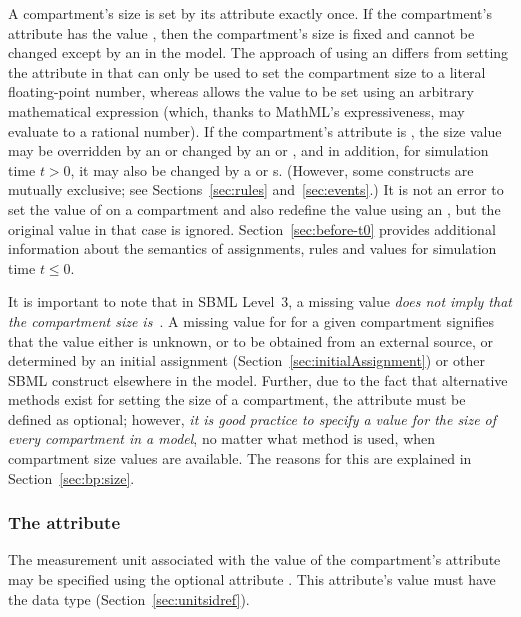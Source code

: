 A compartment's size is set by its  attribute exactly
once.  If the compartment's attribute  has
the value , then the compartment's size is fixed
and cannot be changed except by an \InitialAssignment in the
model.  The approach of using an \InitialAssignment differs from
setting the  attribute in that  can only
be used to set the compartment size to a literal floating-point
number, whereas \InitialAssignment allows the value to be set
using an arbitrary mathematical expression (which, thanks to
MathML's expressiveness, may evaluate to a rational number).  If
the compartment's  attribute is , the
size value may be overridden by an \InitialAssignment or changed
by an \AssignmentRule or \AlgebraicRule, and in addition, for
simulation time $t > 0$, it may also be changed by a \RateRule or
\Event{}s.  (However, some constructs are mutually exclusive; see
Sections~\ref{sec:rules} and~\ref{sec:events}.)  It is not an
error to set the value of  on a compartment and also
redefine the value using an \InitialAssignment, but the original
 value in that case is ignored.
Section~\ref{sec:before-t0} provides additional information about
the semantics of assignments, rules and values for simulation time
$t \leq 0$.

It is important to note that in SBML Level~3, a missing
 value \emph{does not imply that the compartment size
  is~}.  A missing value for  for a given
compartment signifies that the value either is unknown, or to be
obtained from an external source, or determined by an initial
assignment (Section~\ref{sec:initialAssignment}) or other SBML
construct elsewhere in the model.  Further, due to the fact that
alternative methods exist for setting the size of a
compartment, the  attribute must be defined as
optional; however, \emph{it is good practice to specify a value
for the size of every compartment in a model}, no matter what method
is used, when compartment size values are available.  The reasons
for this are explained in Section~\ref{sec:bp:size}.


\subsubsection{The  attribute}
\label{sec:compartment-units}

The measurement unit associated with the value of the
compartment's  attribute may be specified using the
optional attribute .  This attribute's value must
have the data type 
(Section~\ref{sec:unitsidref}).


